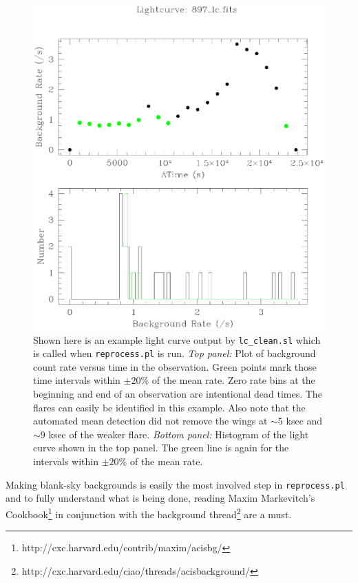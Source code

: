\begin{figure}[htp]
\begin{center}
\includegraphics*[width=\textwidth, trim=0mm 0mm 0mm 0mm, clip]{flare.ps}
\caption[Example of strong X-ray flare in \chandra\ data]{Shown here
is an example light curve output by {\tt{lc\_clean.sl}} which is
called when {\tt{reprocess.pl}} is run. {\it{Top panel:}} Plot of
background count rate versus time in the observation. Green points
mark those time intervals within $\pm 20\%$ of the mean rate. Zero
rate bins at the beginning and end of an observation are intentional
dead times. The flares can easily be identified in this example. Also
note that the automated mean detection did not remove the wings at
$\sim 5$ ksec and $\sim9$ ksec of the weaker flare. {\it{Bottom
panel:}} Histogram of the light curve shown in the top panel. The
green line is again for the intervals within $\pm 20\%$ of the mean
rate.}
\label{fig:flare}
\end{center}
\end{figure}

Making blank-sky backgrounds is easily the most involved step in
{\tt{reprocess.pl}} and to fully understand what is being done,
reading Maxim Markevitch's
Cookbook\footnote{http://cxc.harvard.edu/contrib/maxim/acisbg/} in
conjunction with the background
thread\footnote{http://cxc.harvard.edu/ciao/threads/acisbackground/}
are a must.

